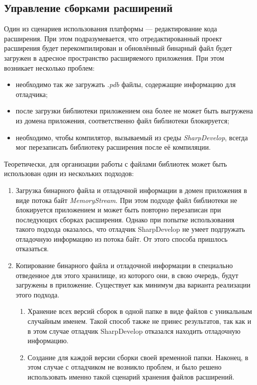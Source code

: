  
\subsection{Управление сборками расширений}
\label{sec:dll_manip}

Один из сценариев использования платформы --- редактирование кода расширения. При этом подразумевается, что отредактированный проект расширения будет перекомпилирован и обновлённый бинарный файл будет загружен в адресное пространство расширяемого приложения. При этом возникает несколько проблем:

\begin{itemize}
  \item необходимо так же загружать {\it .pdb} файлы, содержащие информацию для отладчика;
  \item после загрузки библиотеки приложением она более не может быть выгружена из домена приложения, соответственно файл библиотеки блокируется;
  \item необходимо, чтобы компилятор, вызываемый из среды {\it SharpDevelop}, всегда мог перезаписать библиотеку расширения после её компиляции.
\end{itemize}

Теоретически, для организации работы с файлами библиотек может быть использован один из нескольких подходов:

\begin{enumerate}
  \item Загрузка бинарного файла и отладочной информации в домен приложения в виде потока байт {\it MemoryStream}.
  При этом подходе файл библиотеки не блокируется приложением и может быть повторно перезаписан при последующих сборках расширения. Однако при попытке использования такого подхода оказалось, что отладчик SharpDevelop не умеет подгружать отладочную информацию из потока байт. От этого способа пришлось отказаться.
  \item Копирование бинарного файла и отладочной информации в специально отведенное для этого хранилище, из которого они, в свою очередь, будут загружены в приложение.
  Существует как минимум два варианта реализации этого подхода.
  \begin{enumerate}
    \item Хранение всех версий сборок в одной папке в виде файлов с уникальным случайным именем. Такой способ также не принес результатов, так как и в этом случае отладчик SharpDevelop отказался находить отладочную информацию.
	\item Создание для каждой версии сборки своей временной папки. Наконец, в этом случае с отладчиком не возникло проблем, и было решено использовать именно такой сценарий хранения файлов расширений.
	\end{enumerate}
\end{enumerate}

